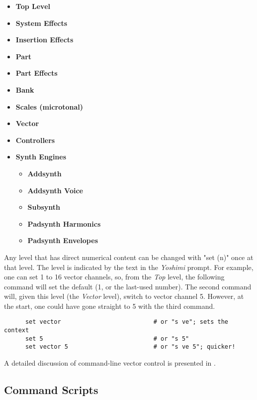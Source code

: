    \begin{itemize}
      \item \textbf{Top Level}
      \item \textbf{System Effects}
      \item \textbf{Insertion Effects}
      \item \textbf{Part}
      \item \textbf{Part Effects}
      \item \textbf{Bank}
      \item \textbf{Scales (microtonal)}
      \item \textbf{Vector}
      \item \textbf{Controllers}
      \item \textbf{Synth Engines}
      \begin{itemize}
         \item \textbf{Addsynth}
         \item \textbf{Addsynth Voice}
         \item \textbf{Subsynth}
         \item \textbf{Padsynth Harmonics}
         \item \textbf{Padsynth Envelopes}
      \end{itemize}
   \end{itemize}

   Any level that has direct numerical content can be changed with
   "set (n)" once at that level.  The level is
   indicated by the text in the \textsl{Yoshimi} prompt.
   For example, one can set 1 to 16 vector channels, so, from the
   \textsl{Top} level, the following command
   will set the default (1, or the last-used number).
   The second command will, given this level (the \textsl{Vector} level),
   switch to vector channel 5.
   However, at the start, one could have gone straight to 5 with the third
   command.

   \begin{verbatim}
      set vector                          # or "s ve"; sets the context
      set 5                               # or "s 5"
      set vector 5                        # or "s ve 5"; quicker!
   \end{verbatim}

   A detailed discussion of command-line vector control is presented in
   .

\subsection{Command Scripts}
\label{subsec:command_line_command_scripts}


